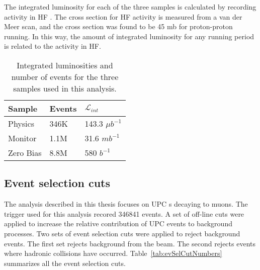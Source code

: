       The integrated luminosity for each of the three samples is calculated
        by recording activity in HF \cite{cmsLumi}. 
      The cross section for HF activity is measured from a van der Meer scan, 
        and the cross section was found to be 45 mb for proton-proton running.
      In this way, the amount of integrated luminosity for any running period is
        related to the activity in HF. 
      \begin{table}
  	    \centering
  	    \begin{tabular}{|l|l|l|}
  	      \hline Sample & Events & $\mathcal{L}_{int}$ \\ \hline \hline
          Physics & 346K & 143.3 $\mu$$b^{-1}$ \\ \hline
          Monitor & 1.1M & 31.6 $mb^{-1}$ \\ \hline
          Zero Bias & 8.8M & 580 $b^{-1}$ \\ \hline 
  	    \end{tabular}
  	    \caption{Integrated luminosities and number of events for the three
  	      samples used in this analysis.}
  	    \label{tab:sampleLumiNevt}
      \end{table}
  
    \subsection{Event selection cuts}
      The analysis described in this thesis focuses on UPC \JPsi{}s decaying to 
        muons. 
      The trigger used for this analysis recored 346841 events.
      A set of off-line cuts were applied to increase the relative contribution 
        of UPC events to background processes. 
      Two sets of event selection cuts were applied to reject background events. 
      The first set rejects background from the beam.
      The second rejects events where hadronic collisions have occurred.
      Table~\ref{tab:evSelCutNumbers} summarizes all the event selection cuts. 
 
